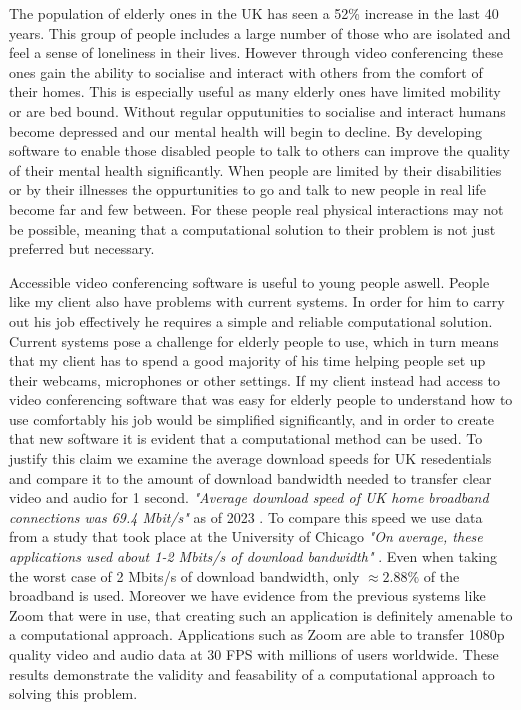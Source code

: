 The population of elderly ones in the UK has seen a 52\% 
increase in the last 40 years. This group of people includes
a large number of those who are isolated and feel a sense of 
loneliness in their lives. However through video conferencing
these ones gain the ability to socialise and interact with 
others from the comfort of their homes. This is especially 
useful as many elderly ones have limited mobility or are bed 
bound. Without regular opputunities to socialise and interact 
humans become depressed and our mental health will begin to 
decline. By developing software to enable those disabled 
people to talk to others can improve the quality of their 
mental health significantly. When people are limited by their 
disabilities or by their illnesses the oppurtunities to go and
talk to new people in real life become far and few between. For
these people real physical interactions may not be possible,
meaning that a computational solution to their problem is not
just preferred but necessary. \vspace{0.2cm}

Accessible video conferencing software is useful to young 
people aswell. People like my client also have problems with 
current systems. In order for him to carry out his job 
effectively he requires a simple and reliable computational
solution. Current systems pose a challenge for elderly people 
to use, which in turn means that my client has to spend a good
majority of his time helping people set up their webcams,
microphones or other settings. If my client instead had access
to video conferencing software that was easy for elderly people
to understand how to use comfortably his job would be 
simplified significantly, and in order to create that new 
software it is evident that a computational method can be 
used. To justify this claim we examine the average download
speeds for UK resedentials and compare it to the amount of 
download bandwidth needed to transfer clear video and audio 
for 1 second. \textit{"Average download speed of UK home 
broadband connections was 69.4 Mbit/s"} as of 2023 \cite{data}.
To compare this speed we use data from a study that took place
at the University of Chicago \textit{"On average, these
applications used about 1-2 Mbits/s of download bandwidth"}
\cite{chicago}. Even when taking the worst case of 2 Mbits/s
of download bandwidth, only $\approx 2.88\%$ of the broadband
is used. Moreover we have evidence from the previous systems 
like Zoom that were in use, that creating such an application
is definitely amenable to a computational approach.
Applications such as Zoom are able to transfer 1080p quality
video and audio data at 30 FPS with millions of users 
worldwide. These results demonstrate the validity and
feasability of a computational approach to solving this
problem. \vspace{0.2cm}

